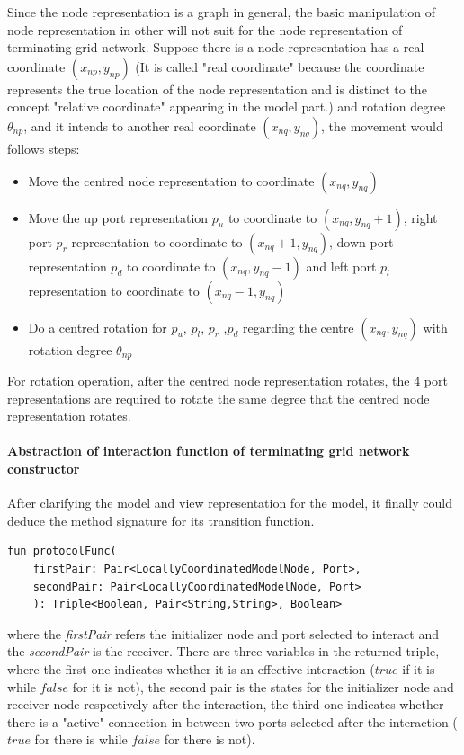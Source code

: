 \par\noindent
Since the node representation is a graph in general, the basic manipulation of node representation in other will not suit for the node representation of
terminating grid network. Suppose there is a node representation has a real coordinate $(x_{np}, y_{np})$ (It is called "real coordinate" because the coordinate represents the true
location of the node representation and is distinct to the concept "relative coordinate" appearing in the model part.) and rotation degree $\theta_{np}$, and it intends to
another real coordinate $(x_{nq}, y_{nq})$, the movement would follows steps:
\begin{itemize}
  \item Move the centred node representation to coordinate $(x_{nq}, y_{nq})$
  \item Move the up port representation $p_{u}$ to coordinate to $(x_{nq}, y_{nq} + 1)$, right port $p_{r}$ representation to coordinate to $(x_{nq} + 1, y_{nq})$,  down port representation $p_{d}$ to coordinate to $(x_{nq}, y_{nq} - 1)$
  and left port $p_{l}$ representation to coordinate to $(x_{nq} - 1, y_{nq})$
  \item Do a centred rotation for $p_{u}$, $p_{l}$, $p_{r}$ ,$p_{d}$ regarding the centre $(x_{nq}, y_{nq})$ with rotation degree $\theta_{np}$
\end{itemize}
For rotation operation, after the centred node representation rotates, the 4 port representations are required to rotate the same degree that the centred node representation rotates.

\paragraph{Abstraction of interaction function of terminating grid network constructor}
After clarifying the model and view representation for the model, it finally could deduce the method signature for its transition function.
\begin{lstlisting}[caption = {Abstraction for terminating grid network constructor interaction function}, style = mykotlin]
  fun protocolFunc(
    firstPair: Pair<LocallyCoordinatedModelNode, Port>,
    secondPair: Pair<LocallyCoordinatedModelNode, Port>
    ): Triple<Boolean, Pair<String,String>, Boolean>
\end{lstlisting}
where the \textit{firstPair} refers the initializer node and port selected to interact and the \textit{secondPair} is the receiver.
There are three variables in the returned triple, where the first one indicates whether it is an effective interaction ($true$ if it is while $false$ for it is not), the second pair is the states
for the initializer node and receiver node respectively after the interaction, the third one indicates whether there is a "active" connection
in between two ports selected after the interaction ($true$ for there is while $false$ for there is not).

